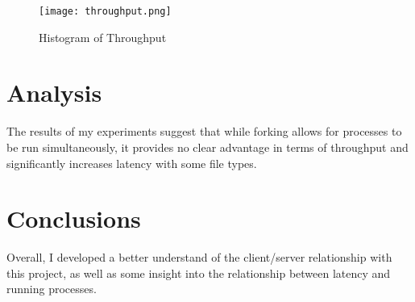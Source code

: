 \documentclass[letterpaper]{article}
\begin{document}
\begin{figure}[h]
\centering
\texttt{[image: throughput.png]}
\caption{Histogram of Throughput}
\label{fig:tput}
\end{figure}

\section{Analysis}

The results of my experiments suggest that while forking allows for processes to be run simultaneously, it provides no clear advantage in terms of throughput and significantly increases latency with some file types.

\section{Conclusions}

Overall, I developed a better understand of the client/server relationship with this project, as well as some insight into the relationship between latency and running processes.
\end{document}

